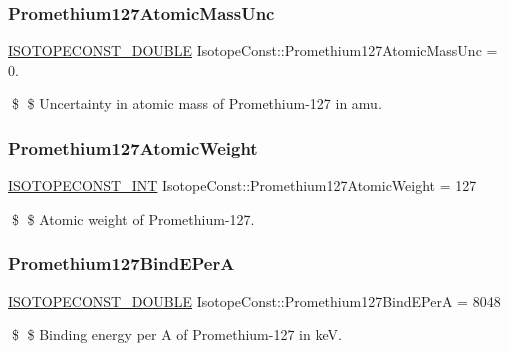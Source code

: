 \subsubsection{\texorpdfstring{Promethium127\+Atomic\+Mass\+Unc}{Promethium127AtomicMassUnc}}
{\footnotesize\ttfamily \mbox{\hyperlink{group___isotope_const-_macros_ga8f45a7272ce02c0b4c65c44636ed719a}{I\+S\+O\+T\+O\+P\+E\+C\+O\+N\+S\+T\+\_\+\+D\+O\+U\+B\+LE}} Isotope\+Const\+::\+Promethium127\+Atomic\+Mass\+Unc = 0.}

\$ \$ Uncertainty in atomic mass of Promethium-\/127 in amu. \mbox{\label{group___isotope_const-_promethium-_pm127_ga92b1c2137a0c5a442eeab72cd3259239}} 
\subsubsection{\texorpdfstring{Promethium127\+Atomic\+Weight}{Promethium127AtomicWeight}}
{\footnotesize\ttfamily \mbox{\hyperlink{group___isotope_const-_macros_ga5f18360b3e99483a35c32d789e62621c}{I\+S\+O\+T\+O\+P\+E\+C\+O\+N\+S\+T\+\_\+\+I\+NT}} Isotope\+Const\+::\+Promethium127\+Atomic\+Weight = 127}

\$ \$ Atomic weight of Promethium-\/127. \mbox{\label{group___isotope_const-_promethium-_pm127_ga07bc0eecc2d0e317b4fb77ad9a677d20}} 
\subsubsection{\texorpdfstring{Promethium127\+Bind\+E\+PerA}{Promethium127BindEPerA}}
{\footnotesize\ttfamily \mbox{\hyperlink{group___isotope_const-_macros_ga8f45a7272ce02c0b4c65c44636ed719a}{I\+S\+O\+T\+O\+P\+E\+C\+O\+N\+S\+T\+\_\+\+D\+O\+U\+B\+LE}} Isotope\+Const\+::\+Promethium127\+Bind\+E\+PerA = 8048}

\$ \$ Binding energy per A of Promethium-\/127 in keV. \mbox{\label{group___isotope_const-_promethium-_pm127_gafae058c3db821e66f676c72f354ef3da}} 
